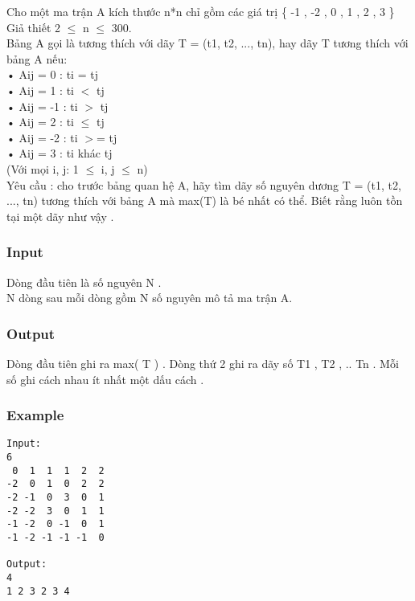 



   Cho một ma trận A kích thước n*n chỉ gồm các giá trị \{ -1 , -2 , 0 , 1 , 2 , 3 \}   
\\   Giả thiết 2  $\le$  n  $\le$  300.   
\\   Bảng A gọi là tương thích với dãy T = (t1, t2, ..., tn), hay dãy T tương thích với bảng A nếu:   
\\   • Aij = 0  :   ti = tj   
\\   • Aij = 1  :   ti $<$ tj   
\\   • Aij = -1 :   ti $>$ tj   
\\   • Aij = 2  :  ti  $\le$  tj   
\\   • Aij = -2 :   ti $>$= tj   
\\   • Aij = 3  :   ti khác tj   
\\   (Với mọi i, j: 1  $\le$  i, j  $\le$  n)   
\\   Yêu cầu : cho trước bảng quan hệ A, hãy tìm dãy số nguyên dương T = (t1, t2, ..., tn) tương thích với bảng A mà max(T) là bé nhất có thể. Biết rằng luôn tồn tại một dãy như vậy .  

\subsubsection{   Input  }

   Dòng đầu tiên là số nguyên N .   
\\   N dòng sau mỗi dòng gồm N số nguyên mô tả ma trận A.  

\subsubsection{   Output  }

   Dòng đầu tiên ghi ra max( T ) . Dòng thứ 2 ghi ra dãy số T1 , T2 , .. Tn . Mỗi số ghi cách nhau ít nhất một dấu cách .  

\subsubsection{   Example  }
\begin{verbatim}
Input:
6
 0  1  1  1  2  2
-2  0  1  0  2  2
-2 -1  0  3  0  1
-2 -2  3  0  1  1
-1 -2  0 -1  0  1
-1 -2 -1 -1 -1  0

Output:
4
1 2 3 2 3 4 
\end{verbatim}
